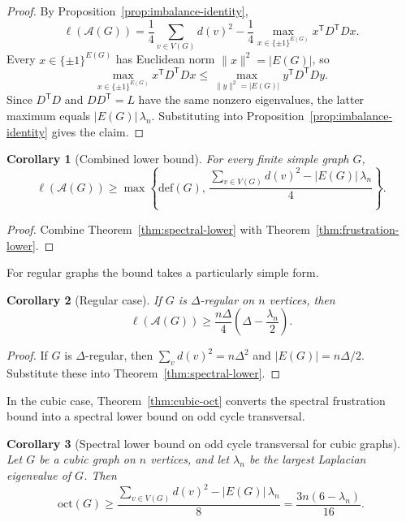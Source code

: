\documentclass[11pt]{article}
\newtheorem{corollary}{Corollary}
\theoremstyle{plain}
\begin{document}
\begin{proof}
By Proposition~\ref{prop:imbalance-identity},
\[
\ell(\mathcal A(G))
=
\frac14\sum_{v\in V(G)} d(v)^2
-
\frac14\max_{x\in\{\pm1\}^{E(G)}} x^{\mathsf T}D^{\mathsf T}Dx.
\]
Every $x\in\{\pm1\}^{E(G)}$ has Euclidean norm $\|x\|^2=|E(G)|$, so
\[
\max_{x\in\{\pm1\}^{E(G)}} x^{\mathsf T}D^{\mathsf T}Dx
\le
\max_{\|y\|^2=|E(G)|} y^{\mathsf T}D^{\mathsf T}Dy.
\]
Since $D^{\mathsf T}D$ and $DD^{\mathsf T}=L$ have the same nonzero eigenvalues,
the latter maximum equals $|E(G)|\,\lambda_n$.
Substituting into Proposition~\ref{prop:imbalance-identity} gives the claim.
\end{proof}

\begin{corollary}[Combined lower bound]
\label{cor:combined-lower}
For every finite simple graph $G$,
\[
\ell(\mathcal A(G))
\ge
\max\left\{
\mathrm{def}(G),\,
\frac{\sum_{v\in V(G)} d(v)^2-|E(G)|\,\lambda_n}{4}
\right\}.
\]
\end{corollary}

\begin{proof}
Combine Theorem~\ref{thm:spectral-lower} with
Theorem~\ref{thm:frustration-lower}.
\end{proof}

For regular graphs the bound takes a particularly simple form.

\begin{corollary}[Regular case]
\label{cor:regular-spectral}
If $G$ is $\Delta$-regular on $n$ vertices, then
\[
\ell(\mathcal A(G))
\ge
\frac{n\Delta}{4}\left(\Delta-\frac{\lambda_n}{2}\right).
\]
\end{corollary}

\begin{proof}
If $G$ is $\Delta$-regular, then $\sum_v d(v)^2=n\Delta^2$ and
$|E(G)|=n\Delta/2$.
Substitute these into Theorem~\ref{thm:spectral-lower}.
\end{proof}

In the cubic case, Theorem~\ref{thm:cubic-oct} converts the spectral frustration
bound into a spectral lower bound on odd cycle transversal.

\begin{corollary}[Spectral lower bound on odd cycle transversal for cubic graphs]
\label{cor:cubic-spectral-oct}
Let $G$ be a cubic graph on $n$ vertices, and let $\lambda_n$ be the largest
Laplacian eigenvalue of $G$.
Then
\[
\mathrm{oct}(G)
\ge
\frac{\sum_{v\in V(G)} d(v)^2-|E(G)|\,\lambda_n}{8}
=
\frac{3n(6-\lambda_n)}{16}.
\]
\end{corollary}
\end{document}
